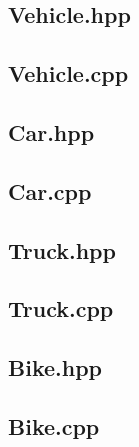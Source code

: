 \documentclass[12pt,naustrian,a4widepaper]{scrartcl}
\begin{document}
\subsection{Vehicle.hpp}

\clearpage
\subsection{Vehicle.cpp}

\clearpage

\subsection{Car.hpp}

\clearpage

\subsection{Car.cpp}


\clearpage
\subsection{Truck.hpp}

\clearpage

\subsection{Truck.cpp}

\clearpage

\subsection{Bike.hpp}


\clearpage
\subsection{Bike.cpp}


%


\end{document}
